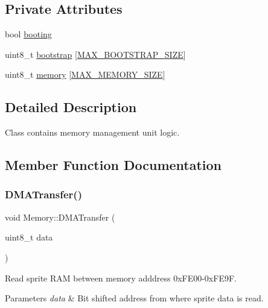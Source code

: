 \subsection*{Private Attributes}
\begin{DoxyCompactItemize}
\item 
bool \mbox{\hyperlink{classMemory_a0fe4ff2902803cdbbb5922f2226e663b}{booting}}
\item 
uint8\+\_\+t \mbox{\hyperlink{classMemory_a8be148954eaf056979fc71314a794587}{bootstrap}} \mbox{[}\mbox{\hyperlink{memory_8hpp_a31b15d7c0080f90bfd04277cf53e30ff}{M\+A\+X\+\_\+\+B\+O\+O\+T\+S\+T\+R\+A\+P\+\_\+\+S\+I\+ZE}}\mbox{]}
\item 
uint8\+\_\+t \mbox{\hyperlink{classMemory_aebc199fcde72a7b3b64eb1a2b670e9ad}{memory}} \mbox{[}\mbox{\hyperlink{memory_8hpp_a85ba7d05d77c30e9d24c88c1419b52b8}{M\+A\+X\+\_\+\+M\+E\+M\+O\+R\+Y\+\_\+\+S\+I\+ZE}}\mbox{]}
\end{DoxyCompactItemize}


\subsection{Detailed Description}
Class contains memory management unit logic. 

\subsection{Member Function Documentation}
\mbox{\label{classMemory_ac486b5f70a08fc36bbda8e101e4ab635}} 
\subsubsection{\texorpdfstring{D\+M\+A\+Transfer()}{DMATransfer()}}
{\footnotesize\ttfamily void Memory\+::\+D\+M\+A\+Transfer (\begin{DoxyParamCaption}\item[{uint8\+\_\+t}]{data }\end{DoxyParamCaption})\hspace{0.3cm}{\ttfamily [private]}}



Read sprite R\+AM between memory adddress 0x\+F\+E00-\/0x\+F\+E9F. 


\begin{DoxyParams}{Parameters}
{\em data} & Bit shifted address from where sprite data is read. \\
\hline
\end{DoxyParams}
\mbox{\label{classMemory_a10b757f7584012b719b3c81aa2688858}} 
